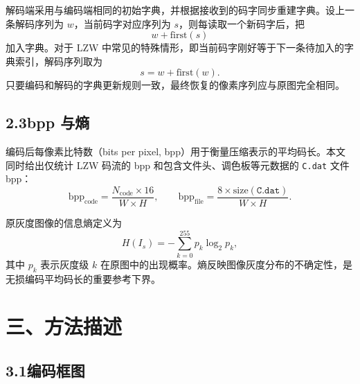 \documentclass[a4paper,zihao=5]{ctexart}
\begin{document}
解码端采用与编码端相同的初始字典，并根据接收到的码字同步重建字典。设上一条解码序列为 $w$，当前码字对应序列为 $s$，则每读取一个新码字后，把
\begin{equation}
  w + \mathrm{first}(s)
\end{equation}
加入字典。对于 LZW 中常见的特殊情形，即当前码字刚好等于下一条待加入的字典索引，解码序列取为
\begin{equation}
  s = w + \mathrm{first}(w).
\end{equation}
只要编码和解码的字典更新规则一致，最终恢复的像素序列应与原图完全相同。

\subsection*{2.3\quad bpp 与熵}

编码后每像素比特数（bits per pixel, bpp）用于衡量压缩表示的平均码长。本文同时给出仅统计 LZW 码流的 bpp 和包含文件头、调色板等元数据的 \texttt{C.dat} 文件 bpp：
\begin{equation}
  \mathrm{bpp}_{\mathrm{code}} =
  \frac{N_{\mathrm{code}}\times 16}{W\times H},
  \qquad
  \mathrm{bpp}_{\mathrm{file}} =
  \frac{8\times \mathrm{size}(\texttt{C.dat})}{W\times H}.
\end{equation}

原灰度图像的信息熵定义为
\begin{equation}
  H(I_s) = -\sum_{k=0}^{255} p_k \log_2 p_k,
\end{equation}
其中 $p_k$ 表示灰度级 $k$ 在原图中的出现概率。熵反映图像灰度分布的不确定性，是无损编码平均码长的重要参考下界。

\section*{三、方法描述}

\subsection*{3.1\quad 编码框图}
\end{document}
